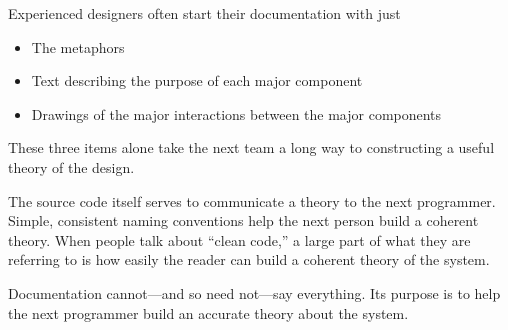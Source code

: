 \documentclass[12pt,letterpaper,twocolumn]{article}
\begin{document}
Experienced designers often start their documentation with just
\begin{itemize}
\item The metaphors
\item Text describing the purpose of each major component
\item Drawings of the major interactions between the major components
\end{itemize}
These three items alone take the next team a long way to constructing a useful theory of the design.

The source code itself serves to communicate a theory to the next programmer. Simple, consistent naming conventions help the next person build a coherent theory. When people talk about ``clean code,'' a large part of what they are referring to is how easily the reader can build a coherent theory of the system.

Documentation cannot---and so need not---say everything. Its purpose is to help the next programmer build an accurate theory about the system.
\end{document}
